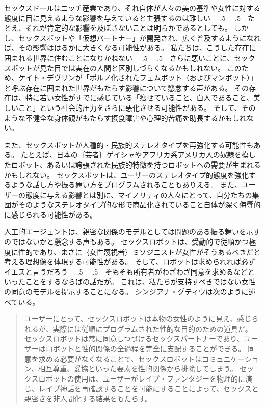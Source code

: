 \documentclass[paper=a4,book,openany]{jlreq}
\def\DDASH{―\kern-.5\zw―\kern-.5\zw―} %
\begin{document}
セックスドールはニッチ産業であり、それ自体が人々の美の基準や女性に対する態度に目に見えるような影響を与えていると主張するのは難しい{\DDASH}たとえ、それが肯定的な影響を及ぼさないことは明らかであるとしても。
しかし、セックスボットや「仮想パートナー」が開発され、広く普及するようになれば、その影響ははるかに大きくなる可能性がある。
私たちは、こうした存在に囲まれる世界に住むことになりかねない{\DDASH}さらに悪いことに、セックスボットが見た目では実在の人間と区別しづらくなるかもしれない。
このため、ケイト・デヴリンが「ポルノ化されたフェムボット（およびマンボット）」と呼ぶ存在に囲まれた世界がもたらす影響について懸念する声がある\citep[cf.][]{devlin19:_turned}。
その存在は、特に若い女性がすでに感じている「痩せていること、白人であること、美しいこと」という社会的圧力をさらに悪化させる可能性がある。
そして、そのような不健全な身体観がもたらす摂食障害や心理的苦痛を助長するかもしれない。

また、セックスボットが人種的・民族的ステレオタイプを再強化する可能性もある。
たとえば、日本の｛芸者｝{ゲイシャ}やアフリカ系アメリカ人の奴隷を模したロボット、あるいは誇張された民族的特徴を持つロボットへの需要が生まれるかもしれない。
セックスボットは、ユーザーのステレオタイプ的態度を強化するような話し方や振る舞い方をプログラムされることもありえる。
また、ユーザーの態度に与える影響とは別に、マイノリティの人々にとって、自分たちの集団がそのようなステレオタイプ的な形で商品化されていること自体が深く侮辱的に感じられる可能性がある。

人工的エージェントは、親密な関係のモデルとしては問題のある振る舞いを示すのではないかと懸念する声もある。
セックスロボットは、受動的で従順かつ極度に性的であり、まさに｛女性蔑視者｝{ミソジニスト}が女性がそうあるべきだと考える理想像を体現する可能性がある。
そして、ロボットは求められれば必ずイエスと言うだろう{\DDASH}そもそも所有者がわざわざ同意を求めるなどといったことをするならばの話だが。
これは、私たちが支持すべきではない女性の同意のモデルを提示することになる。
シンジアナ・グティウは次のように述べている。

\begin{quote}
 ユーザーにとって、セックスロボットは本物の女性のように見え、感じられるが、実際には従順にプログラムされた性的な目的のための道具だ。
セックスロボットは常に同意しつづけるセックスパートナーであり、ユーザーはロボットと性的関係の全過程を完全に支配することができる。
同意を求める必要がなくなることで、セックスロボットはコミュニケーション、相互尊重、妥協といった要素を性的関係から排除してしまう。
セックスロボットの使用は、ユーザーがレイプ・ファンタジーを物理的に演じ、レイプ神話を再確認することを可能にすることによって、セックスと親密さを非人間化する結果をもたらす。
\citep[p.187]{gutiu16:_robot_consen}
\end{quote}
\end{document}
